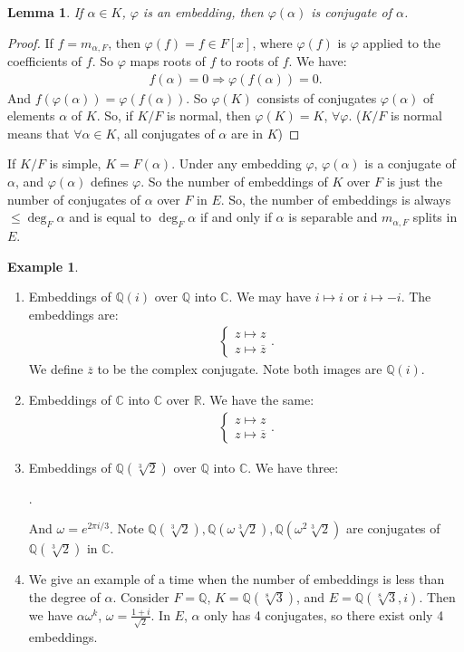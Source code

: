 \documentclass[9pt,reqno,twoside]{amsbook}
\theoremstyle{plain}
\numberwithin{section}{chapter}
\numberwithin{equation}{chapter}
\newtheorem{lem}[theorem]{Lemma}
\theoremstyle{definition}
\newtheorem{Ex}[theorem]{Example}
\theoremstyle{remark}
\theoremstyle{plain}
\newcommand{\R}{\mathbb{R}}
\newcommand{\Q}{\mathbb{Q}}
\renewcommand{\c}{\mathbb{C}}
\newcommand{\bee}{\begin{equation}\begin{aligned}}
\newcommand{\eee}{\end{aligned}\end{equation}}
\newcommand{\fracc}{\frac}
\renewcommand{\leq}{\leqslant}
\renewcommand{\bar}{\overline}%
\renewcommand{\phi}{\varphi}
\begin{document}
\begin{lem}
If $\alpha \in K$, $\phi$ is an embedding, then $\phi(\alpha)$ is conjugate of $\alpha$. 
\end{lem}

\begin{proof}
If $f = m_{\alpha,F}$, then $\phi(f) = f \in F[x]$, where $\phi(f)$ is $\phi$ applied to the coefficients of $f$. So $\phi$ maps roots of $f$ to roots of $f$. We have:
\bee
f(\alpha) = 0 \Rightarrow \phi(f(\alpha)) = 0.
\eee
And $f(\phi(\alpha)) = \phi(f(\alpha))$. So $\phi(K)$ consists of conjugates $\phi(\alpha)$ of elements $\alpha$ of $K$. So, if $K/F$ is normal, then $\phi(K) = K$, $\forall \phi$. ($K/F$ is normal means that $\forall \alpha \in K$, all conjugates of $\alpha$ are in $K$)
\end{proof}

If $K/F$ is simple, $K = F(\alpha)$. 
Under any embedding $\phi$, $\phi(\alpha)$ is a conjugate of $\alpha$, and $\phi(\alpha)$ defines $\phi$. So the number of embeddings of $K$ over $F$ is just the number of conjugates of $\alpha$ over $F$ in $E$. So, the number of embeddings is always $\leq\deg_F\alpha$ and is equal to $\deg_F\alpha$ if and only if $\alpha$ is separable and $m_{\alpha,F}$ splits in $E$. 


\begin{Ex}
\begin{enumerate}
\item Embeddings of $\Q(i)$ over $\Q$ into $\c$. We may have $i \mapsto i$ or $i \mapsto -i$. The embeddings are:
\bee
\begin{cases}
z \mapsto z\\
z \mapsto \bar{z}
\end{cases}.
\eee
We define $\bar{z}$ to be the complex conjugate. 
Note both images are $\Q(i)$. 
\item Embeddings of $\c$ into $\c$ over $\R$. We have the same:
\bee
\begin{cases}
z \mapsto z\\
z \mapsto \bar{z}
\end{cases}.
\eee
\item Embeddings of $\Q(\sqrt[3]{2})$ over $\Q$ into $\c$. We have three:
\begin{center}
.
\end{center}
And $\omega = e^{2\pi i/3}$. Note $\Q(\sqrt[3]{2}),\Q(\omega\sqrt[3]{2}),\Q(\omega^2\sqrt[3]{2})$ are conjugates of $\Q(\sqrt[3]{2})$ in $\c$. 

\item We give an example of a time when the number of embeddings is less than the degree of $\alpha$. Consider $F = \Q$, $K = \Q(\sqrt[8]{3})$, and $E = \Q(\sqrt[8]{3},i)$. Then we have $\alpha\omega^k$, $\omega = \fracc{1+ i}{\sqrt{2}}$. In $E$, $\alpha$ only has 4 conjugates, so there exist only 4 embeddings. 
\end{enumerate}
\end{Ex}
\end{document}
